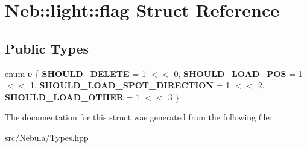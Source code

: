 \hypertarget{structNeb_1_1light_1_1flag}{\section{\-Neb\-:\-:light\-:\-:flag \-Struct \-Reference}
\label{structNeb_1_1light_1_1flag}
}
\subsection*{\-Public \-Types}
\begin{DoxyCompactItemize}
\item 
enum {\bfseries e} \{ {\bfseries \-S\-H\-O\-U\-L\-D\-\_\-\-D\-E\-L\-E\-T\-E} =  1 $<$$<$ 0, 
{\bfseries \-S\-H\-O\-U\-L\-D\-\_\-\-L\-O\-A\-D\-\_\-\-P\-O\-S} =  1 $<$$<$ 1, 
{\bfseries \-S\-H\-O\-U\-L\-D\-\_\-\-L\-O\-A\-D\-\_\-\-S\-P\-O\-T\-\_\-\-D\-I\-R\-E\-C\-T\-I\-O\-N} =  1 $<$$<$ 2, 
{\bfseries \-S\-H\-O\-U\-L\-D\-\_\-\-L\-O\-A\-D\-\_\-\-O\-T\-H\-E\-R} =  1 $<$$<$ 3
 \}
\end{DoxyCompactItemize}


\-The documentation for this struct was generated from the following file\-:\begin{DoxyCompactItemize}
\item 
src/\-Nebula/\-Types.\-hpp\end{DoxyCompactItemize}
